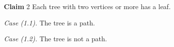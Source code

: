 \documentclass{article}
\newcommand{\claim}{{\noindent \bf Claim }}
\begin{document}
\claim{2} Each tree with two vertices or more has a leaf.

{\em Case (1.1).} The tree is a path.

{\em Case (1.2).} The tree is not a path.
\end{document}
